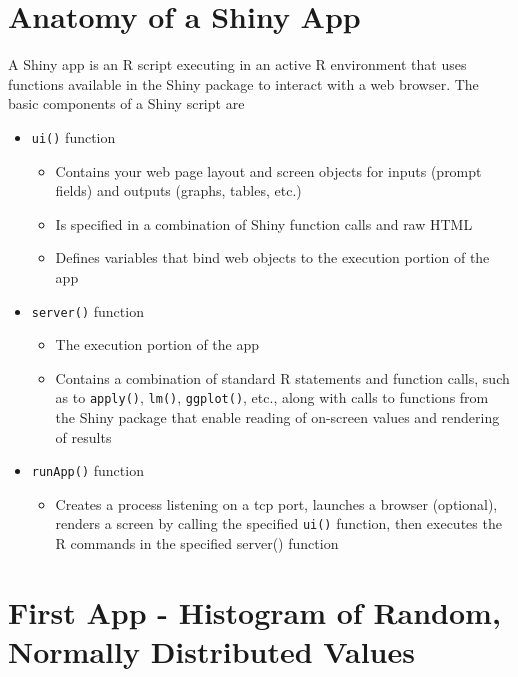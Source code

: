 \documentclass[10pt, letterpaper]{article}
\begin{document}
\begin{spacing}{1.0}
\section{Anatomy of a Shiny App}\label{sec:anatomyofapp}

A Shiny app is an R script executing in an active R environment that uses functions available in the Shiny package to interact with a web browser.  The basic components of a Shiny script are

\begin{itemize}
  \item \texttt{ui()} function
    \begin{itemize}
      \item Contains your web page layout and screen objects for inputs (prompt fields) and outputs (graphs, tables, etc.)
      \item Is specified in a combination of Shiny function calls and raw HTML
      \item Defines variables that bind web objects to the execution portion of the app
    \end{itemize}
  \item \texttt{server()} function
    \begin{itemize}
      \item The execution portion of the app
      \item Contains a combination of standard R statements and function calls, such as to \texttt{apply()}, \texttt{lm()}, \texttt{ggplot()}, etc., along with calls to functions from the Shiny package that enable reading of on-screen values and rendering of results
    \end{itemize}
  \item \texttt{runApp()} function
    \begin{itemize}
      \item Creates a process listening on a tcp port, launches a browser (optional), renders a screen by calling the specified \texttt{ui()} function, then executes the R commands in the specified server() function
    \end{itemize}
\end{itemize}


\section{First App - Histogram of Random, Normally Distributed Values}\label{sec:firstappNPD}


\end{spacing}
\end{document}
